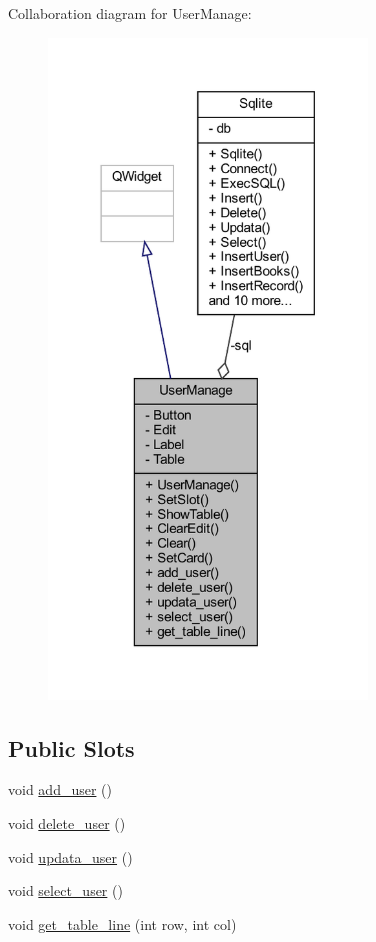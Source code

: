 Collaboration diagram for User\+Manage\+:
\nopagebreak
\begin{figure}[H]
\begin{center}
\leavevmode
\includegraphics[width=240pt]{class_user_manage__coll__graph}
\end{center}
\end{figure}
\subsection*{Public Slots}
\begin{DoxyCompactItemize}
\item 
void \mbox{\hyperlink{class_user_manage_a7058bbb981e4c6b3064c3e5e334ac700}{add\+\_\+user}} ()
\item 
void \mbox{\hyperlink{class_user_manage_a254765c27c79b94370dd9f1e44551355}{delete\+\_\+user}} ()
\item 
void \mbox{\hyperlink{class_user_manage_ab7f81e5e1f3d9944c551401dba37693f}{updata\+\_\+user}} ()
\item 
void \mbox{\hyperlink{class_user_manage_aa6252c8286f24959ec4b938054328bf7}{select\+\_\+user}} ()
\item 
void \mbox{\hyperlink{class_user_manage_acf5b626b21868282ff4ad9dcccf8c765}{get\+\_\+table\+\_\+line}} (int row, int col)
\end{DoxyCompactItemize}
